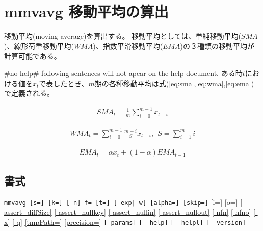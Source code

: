 
%

\section{mmvavg 移動平均の算出\label{sect:mmvavg}}

移動平均(moving average)を算出する。
移動平均としては、単純移動平均($SMA$)、線形荷重移動平均($WMA$)、指数平滑移動平均($EMA$)の３種類の移動平均が計算可能である。

 #no help# following sentences will not apear on the help document. \fi
ある時$t$における値を$x_t$で表したとき、$m$期の各種移動平均は式(\ref{eq:sma},\ref{eq:wma},\ref{eq:ema})で定義される。

\begin{eqnarray}
SMA_t=\frac{1}{m} \sum_{i=0}^{m-1} x_{t-i}
\label{eq:sma}
\end{eqnarray}

\begin{eqnarray}
WMA_t=\sum_{i=0}^{m-1} \frac{m-i}{S} x_{t-i},\ \ S=\sum_{i=1}^m i
\label{eq:wma}
\end{eqnarray}

\begin{eqnarray}
EMA_t=\alpha x_t + (1-\alpha)EMA_{t-1}
\label{eq:ema}
\end{eqnarray}

\subsection*{書式}
\verb/mmvavg [s=] [k=] [-n] f= [t=] [-exp|-w] [alpha=] [skip=]/
\hyperref[sect:option_i]{[i=]}
\hyperref[sect:option_o]{[o=]}
\hyperref[sect:option_assert_diffSize]{[-assert\_diffSize]}
\hyperref[sect:option_assert_nullkey]{[-assert\_nullkey]}
\hyperref[sect:option_assert_nullin]{[-assert\_nullin]}
\hyperref[sect:option_assert_nullout]{[-assert\_nullout]}
\hyperref[sect:option_nfn]{[-nfn]} 
\hyperref[sect:option_nfno]{[-nfno]}  
\hyperref[sect:option_x]{[-x]}
\hyperref[sect:option_q]{[-q]}
\hyperref[sect:option_option_tmppath]{[tmpPath=]}
\hyperref[sect:option_precision]{[precision=]}
\verb|[-params]|
\verb|[--help]|
\verb|[--helpl]|
\verb|[--version]|\\

